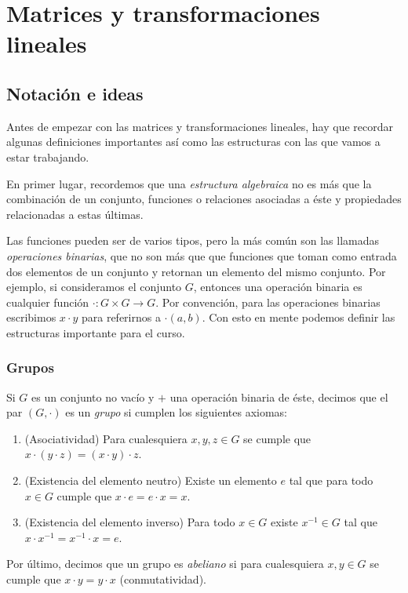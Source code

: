 \chapter{Matrices y transformaciones lineales}

\section{Notación e ideas}

Antes de empezar con las matrices y transformaciones lineales, hay que recordar algunas definiciones importantes así como las estructuras con las que vamos a estar trabajando.

En primer lugar, recordemos que una \emph{estructura algebraica} no es más que la combinación de un conjunto, funciones o relaciones asociadas a éste y propiedades relacionadas a estas últimas.

Las funciones pueden ser de varios tipos, pero la más común son las llamadas \emph{operaciones binarias}, que no son más que que funciones que toman como entrada dos elementos de un conjunto y retornan un elemento del mismo conjunto. Por ejemplo, si consideramos el conjunto $G$, entonces una operación binaria es cualquier función $\cdot \colon  G \times G \to G$. Por convención, para las operaciones binarias escribimos $x \cdot y$  para referirnos a $\cdot(a,b)$. Con esto en mente podemos definir las estructuras importante para el curso.

\subsection{Grupos}

\begin{defi}
  Si $G$ es un conjunto no vacío y $+$ una operación binaria de éste, decimos que el par $(G, \cdot)$ es un \emph{grupo} si cumplen los siguientes axiomas:
  \begin{enumerate}
    \item (Asociatividad) Para cualesquiera $x, y, z \in G$ se cumple que $x\cdot(y\cdot z) = (x\cdot y)\cdot z$.
    \item (Existencia del elemento neutro) Existe un elemento $e$ tal que para todo $x \in G$ cumple que $x\cdot e = e\cdot x = x$.
    \item (Existencia del elemento inverso) Para todo $x \in G$ existe $x^{-1} \in G$ tal que $x\cdot x^{-1} = x^{-1}\cdot x = e$.
  \end{enumerate}

  Por último, decimos que un grupo es \emph{abeliano} si para cualesquiera $x,y \in G$ se cumple que $x\cdot y = y \cdot x$ (conmutatividad).
\end{defi}

